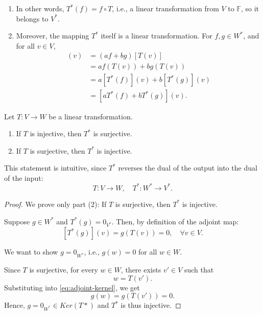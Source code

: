 \begin{enumerate}
  \item In other words, \( T^*(f) = f \circ T \), i.e., a linear transformation from \( V \) to \( \mathbb{F} \), so it belongs to \( V^* \).

  \item Moreover, the mapping \( T^* \) itself is a linear transformation. For \( f, g \in W^* \), and for all \( v \in V \),
  \begin{align*}
  [T^*(af + bg)](v) &= (af + bg)[T(v)] \\
  &= a f(T(v)) + b g(T(v)) \\
  &= a [T^*(f)](v) + b [T^*(g)](v) \\
  &= [a T^*(f) + b T^*(g)](v).
  \end{align*}
\end{enumerate}

\begin{proposition}\label{prop: adjoint-injectivity-surjectivity}
Let \( T : V \to W \) be a linear transformation.
\begin{enumerate}
  \item If \( T \) is injective, then \( T^* \) is surjective.
  \item If \( T \) is surjective, then \( T^* \) is injective.
\end{enumerate}
This statement is intuitive, since \( T^* \) reverses the dual of the output into the dual of the input:
\[
T : V \to W, \quad T^* : W^* \to V^*.
\]
\end{proposition}

\begin{proof}
We prove only part (2): If \( T \) is surjective, then \( T^* \) is injective.

Suppose \( g \in W^* \) and \( T^*(g) = 0_{V^*} \). Then, by definition of the adjoint map:
\begin{equation} \label{eq:adjoint-kernel}
[T^*(g)](v) = g(T(v)) = 0, \quad \forall v \in V.
\end{equation}

We want to show \( g = 0_{W^*} \), i.e., \( g(w) = 0 \) for all \( w \in W \).

Since \( T \) is surjective, for every \( w \in W \), there exists \( v' \in V \) such that
\[
w = T(v').
\]
Substituting into \eqref{eq:adjoint-kernel}, we get
\[
g(w) = g(T(v')) = 0.
\]
Hence, \( g = 0_{W^*} \in Ker(T*)\) and \( T^* \) is thus injective.
\end{proof}

